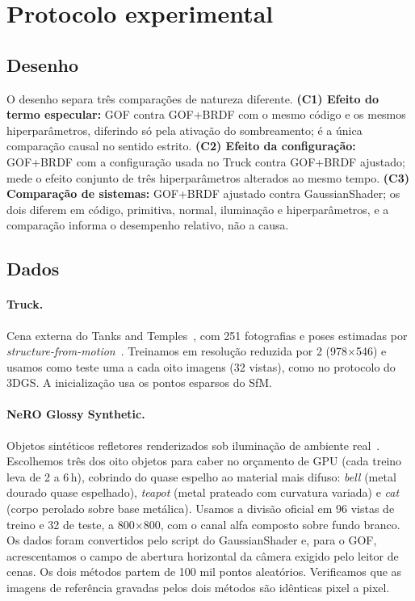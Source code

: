 \documentclass[12pt]{article}
\begin{document}
\section{Protocolo experimental}
\label{sec:protocolo}

\subsection{Desenho}
O desenho separa três comparações de natureza diferente.
\textbf{(C1) Efeito do termo especular:} GOF contra GOF+BRDF com o mesmo código e os mesmos hiperparâmetros, diferindo só pela ativação do sombreamento; é a única comparação causal no sentido estrito.
\textbf{(C2) Efeito da configuração:} GOF+BRDF com a configuração usada no Truck contra GOF+BRDF ajustado; mede o efeito conjunto de três hiperparâmetros alterados ao mesmo tempo.
\textbf{(C3) Comparação de sistemas:} GOF+BRDF ajustado contra GaussianShader; os dois diferem em código, primitiva, normal, iluminação e hiperparâmetros, e a comparação informa o desempenho relativo, não a causa.

\subsection{Dados}
\paragraph{Truck.}
Cena externa do Tanks and Temples~\cite{knapitsch2017tanks}, com 251 fotografias e poses estimadas por \emph{structure-from-motion}~\cite{schonberger2016colmap}.
Treinamos em resolução reduzida por 2 (978$\times$546) e usamos como teste uma a cada oito imagens (32 vistas), como no protocolo do 3DGS.
A inicialização usa os pontos esparsos do SfM.

\paragraph{NeRO Glossy Synthetic.}
Objetos sintéticos refletores renderizados sob iluminação de ambiente real~\cite{liu2023nero}.
Escolhemos três dos oito objetos para caber no orçamento de GPU (cada treino leva de 2 a 6\,h), cobrindo do quase espelho ao material mais difuso: \emph{bell} (metal dourado quase espelhado), \emph{teapot} (metal prateado com curvatura variada) e \emph{cat} (corpo perolado sobre base metálica).
Usamos a divisão oficial em 96 vistas de treino e 32 de teste, a 800$\times$800, com o canal alfa composto sobre fundo branco.
Os dados foram convertidos pelo script do GaussianShader e, para o GOF, acrescentamos o campo de abertura horizontal da câmera exigido pelo leitor de cenas.
Os dois métodos partem de 100 mil pontos aleatórios.
Verificamos que as imagens de referência gravadas pelos dois métodos são idênticas pixel a pixel.
\end{document}
